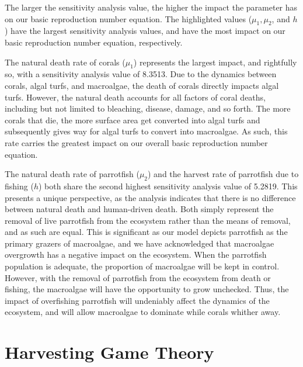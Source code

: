 \documentclass[12pt]{article}
\begin{document}
    The larger the sensitivity analysis value, the higher the impact the parameter has on our basic reproduction number equation. The highlighted values ($\mu_{1}, \mu_{2}$, and $h$) have the largest sensitivity analysis values, and have the most impact on our basic reproduction number equation, respectively. \par
    The natural death rate of corals ($\mu_{1}$) represents the largest impact, and rightfully so, with a sensitivity analysis value of 8.3513. Due to the dynamics between corals, algal turfs, and macroalgae, the death of corals directly impacts algal turfs. However, the natural death accounts for all factors of coral deaths, including but not limited to bleaching, disease, damage, and so forth. The more corals that die, the more surface area get converted into algal turfs and subsequently gives way for algal turfs to convert into macroalgae. As such, this rate carries the greatest impact on our overall basic reproduction number equation. \par
    The natural death rate of parrotfish ($\mu_{2}$) and the harvest rate of parrotfish due to fishing ($h$) both share the second highest sensitivity analysis value of 5.2819. This presents a unique perspective, as the analysis indicates that there is no difference between natural death and human-driven death. Both simply represent the removal of live parrotfish from the ecosystem rather than the means of removal, and as such are equal. This is significant as our model depicts parrotfish as the primary grazers of macroalgae, and we have acknowledged that macroalgae overgrowth has a negative impact on the ecosystem. When the parrotfish population is adequate, the proportion of macroalgae will be kept in control. However, with the removal of parrotfish from the ecosystem from death or fishing, the macroalgae will have the opportunity to grow unchecked. Thus, the impact of overfishing parrotfish will undeniably affect the dynamics of the ecosystem, and will allow macroalgae to dominate while corals whither away.
    
\section{Harvesting Game Theory}
\end{document}
